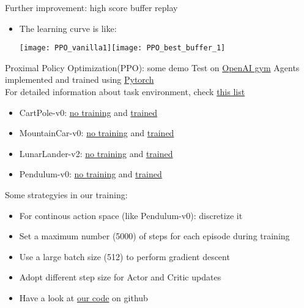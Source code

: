\begin{frame}{Further improvement: high score buffer replay}
    \begin{itemize}
        \item The learning curve is like:\\
        \begin{flushleft}\texttt{[image: PPO\_vanilla1]}\texttt{[image: PPO\_best\_buffer\_1]}\end{flushleft}
    \end{itemize}  
\end{frame}


\begin{frame}{Proximal Policy Optimization(PPO): some demo}
    \vspace{0.15cm}
    Test on \href{https://gym.openai.com/}{OpenAI gym} Agents implemented and trained using \href{https://en.wikipedia.org/wiki/PyTorch}{Pytorch}\\\vspace{0.15cm}
    For detailed information about task environment, check \href{https://github.com/openai/gym/wiki/Table-of-environments}{this list}\\\vspace{0.15cm}
    \begin{itemize}
        \item CartPole-v0: \href{https://www.youtube.com/watch?v=1bvTOM7Az3s}{no training} and \href{https://www.youtube.com/watch?v=l1gOoNFSq8E}{trained}
        \item MountainCar-v0: \href{https://www.youtube.com/watch?v=SAGHdqGvbzA}{no training} and \href{https://www.youtube.com/watch?v=6wYzj74x_l4}{trained}
        \item LunarLander-v2: \href{https://www.youtube.com/watch?v=ZFmx0l6Pe60}{no training} and \href{https://www.youtube.com/watch?v=BysTYEG4fDE}{trained}
        \item Pendulum-v0: \href{https://www.youtube.com/watch?v=bxojAfY5PPw&t=5s}{no training} and \href{https://www.youtube.com/watch?v=yasKyY3hE88}{trained}
    \end{itemize}
    Some strategyies in our training:\\\vspace{0.15cm}
     \begin{itemize}
        \item For continous action space (like Pendulum-v0): discretize it
        \item Set a maximum number (5000) of steps for each episode during training
        \item Use a large batch size (512) to perform gradient descent
        \item Adopt different step size for Actor and Critic updates
        \item Have a look at \href{https://github.com/JamesTuna/RL_collects/blob/master/PPO/PPO.py}{our code} on github
    \end{itemize}
\end{frame}

